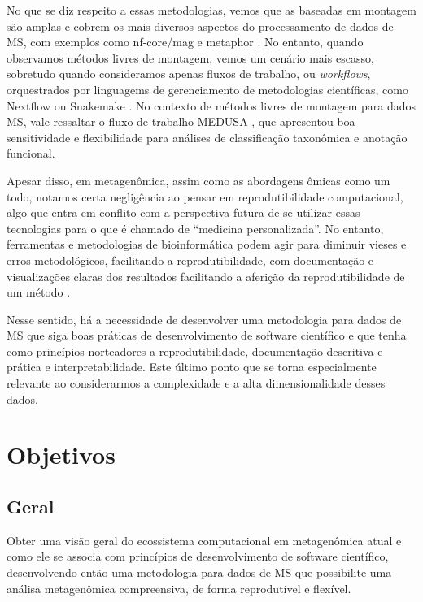 \documentclass[
	12pt,				%
	oneside,			%
	a4paper,			%
	chapter=TITLE,		%
	section=TITLE,		%
	english,			%
	brazil				%
	]{abntex2}
\begin{document}
No que se diz respeito a essas metodologias, vemos que as baseadas em montagem são amplas e cobrem os mais diversos aspectos do processamento de dados de \gls{MS}, com exemplos como nf-core/mag \autocite{krakau2022} e metaphor \autocite{salazar2023}. No entanto, quando observamos métodos livres de montagem, vemos um cenário mais escasso, sobretudo quando consideramos apenas fluxos de trabalho, ou \emph{workflows}, orquestrados por linguagems de gerenciamento de metodologias científicas, como Nextflow \autocite{ditommaso2017} ou Snakemake \autocite{mölder2021}. No contexto de métodos livres de montagem para dados \gls{MS}, vale ressaltar o fluxo de trabalho MEDUSA \autocite{morais2022}, que apresentou boa sensitividade e flexibilidade para análises de classificação taxonômica e anotação funcional.

Apesar disso, em metagenômica, assim como as abordagens ômicas como um todo, notamos certa negligência ao pensar em reprodutibilidade computacional, algo que entra em conflito com a perspectiva futura de se utilizar essas tecnologias para o que é chamado de ``medicina personalizada''. No entanto, ferramentas e metodologias de bioinformática podem agir para diminuir vieses e erros metodológicos, facilitando a reprodutibilidade, com documentação e visualizações claras dos resultados facilitando a aferição da reprodutibilidade de um método \autocite{baykal2024}.

Nesse sentido, há a necessidade de desenvolver uma metodologia para dados de \gls{MS} que siga boas práticas de desenvolvimento de software científico e que tenha como princípios norteadores a reprodutibilidade, documentação descritiva e prática e interpretabilidade. Este último ponto que se torna especialmente relevante ao considerarmos a complexidade e a alta dimensionalidade desses dados.

\chapter{Objetivos}\label{obj}

\section{Geral}\label{geral}

Obter uma visão geral do ecossistema computacional em metagenômica atual e como ele se associa
com princípios de desenvolvimento de software científico, desenvolvendo então uma metodologia
para dados de \gls{MS} que possibilite uma análisa metagenômica compreensiva, de forma reprodutível e flexível.
\end{document}
